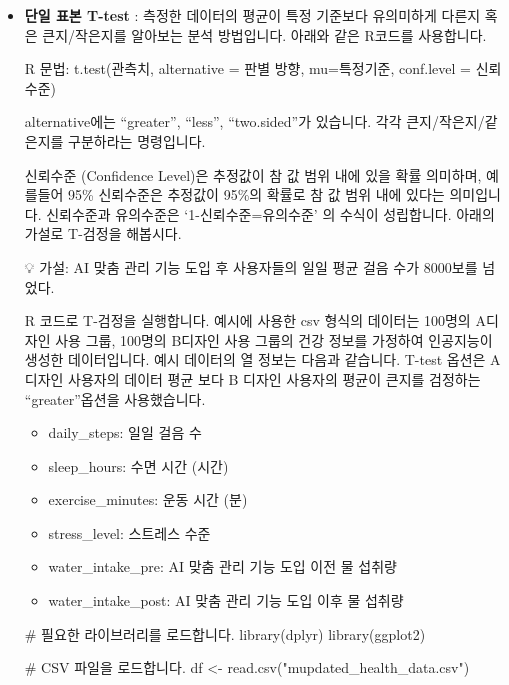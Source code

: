 \documentclass[
  letterpaper,
]{book}
\newenvironment{Shaded}{\begin{snugshade}}{\end{snugshade}}
\newcommand{\CommentTok}[1]{\textcolor[rgb]{0.37,0.37,0.37}{#1}}
\newcommand{\FunctionTok}[1]{\textcolor[rgb]{0.28,0.35,0.67}{#1}}
\newcommand{\NormalTok}[1]{\textcolor[rgb]{0.00,0.23,0.31}{#1}}
\newcommand{\OtherTok}[1]{\textcolor[rgb]{0.00,0.23,0.31}{#1}}
\newcommand{\StringTok}[1]{\textcolor[rgb]{0.13,0.47,0.30}{#1}}
\providecommand{\tightlist}{%
  \setlength{\itemsep}{0pt}\setlength{\parskip}{0pt}}\usepackage{longtable,booktabs,array}
\renewenvironment{Shaded}
    {\begin{snugshade}
    \begin{singlespace}
    \linespread{1}
    }
    {\end{singlespace}
    \end{snugshade}
}
\begin{document}
\begin{itemize}
\item
  \textbf{단일 표본 T-test} : 측정한 데이터의 평균이 특정 기준보다
  유의미하게 다른지 혹은 큰지/작은지를 알아보는 분석 방법입니다. 아래와
  같은 R코드를 사용합니다.

  R 문법: t.test(관측치, alternative = 판별 방향, mu=특정기준,
  conf.level = 신뢰수준)

  alternative에는 ``greater'', ``less'', ``two.sided''가 있습니다. 각각
  큰지/작은지/같은지를 구분하라는 명령입니다.

  신뢰수준 (Confidence Level)은 추정값이 참 값 범위 내에 있을 확률
  의미하며, 예를들어 95\% 신뢰수준은 추정값이 95\%의 확률로 참 값 범위
  내에 있다는 의미입니다. 신뢰수준과 유의수준은 `1-신뢰수준=유의수준' 의
  수식이 성립합니다. 아래의 가설로 T-검정을 해봅시다.

  💡 가설: AI 맞춤 관리 기능 도입 후 사용자들의 일일 평균 걸음 수가
  8000보를 넘었다.

  R 코드로 T-검정을 실행합니다. 예시에 사용한 csv 형식의 데이터는
  100명의 A디자인 사용 그룹, 100명의 B디자인 사용 그룹의 건강 정보를
  가정하여 인공지능이 생성한 데이터입니다. 예시 데이터의 열 정보는
  다음과 같습니다. T-test 옵션은 A 디자인 사용자의 데이터 평균 보다 B
  디자인 사용자의 평균이 큰지를 검정하는 ``greater''옵션을 사용했습니다.

  \begin{itemize}
  \tightlist
  \item
    daily\_steps: 일일 걸음 수
  \item
    sleep\_hours: 수면 시간 (시간)
  \item
    exercise\_minutes: 운동 시간 (분)
  \item
    stress\_level: 스트레스 수준
  \item
    water\_intake\_pre: AI 맞춤 관리 기능 도입 이전 물 섭취량
  \item
    water\_intake\_post: AI 맞춤 관리 기능 도입 이후 물 섭취량
  \end{itemize}

\begin{Shaded}
\begin{Highlighting}[]
\CommentTok{\# 필요한 라이브러리를 로드합니다.}
\FunctionTok{library}\NormalTok{(dplyr)}
\FunctionTok{library}\NormalTok{(ggplot2)}

\CommentTok{\# CSV 파일을 로드합니다.}
\NormalTok{df }\OtherTok{\textless{}{-}} \FunctionTok{read.csv}\NormalTok{(}\StringTok{"mupdated\_health\_data.csv"}\NormalTok{)}


\end{Highlighting}
\end{Shaded}
\end{itemize}
\end{document}
